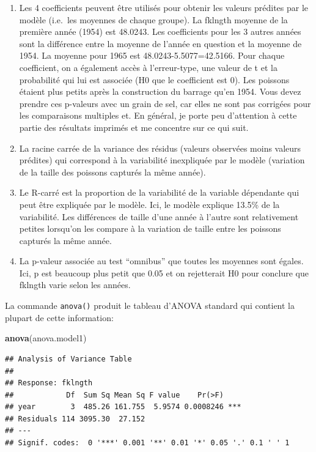 \documentclass[12pt,]{book}
\newenvironment{Shaded}{\begin{snugshade}}{\end{snugshade}}
\newcommand{\KeywordTok}[1]{\textcolor[rgb]{0.27,0.27,0.27}{\textbf{#1}}}
\newcommand{\NormalTok}[1]{#1}
\providecommand{\tightlist}{%
  \setlength{\itemsep}{0pt}\setlength{\parskip}{0pt}}
\begin{document}
\begin{enumerate}
\def\labelenumi{\arabic{enumi}.}
\tightlist
\item
  Les 4 coefficients peuvent être utilisés pour obtenir les valeurs prédites par le modèle (i.e.~les moyennes de chaque groupe). La fklngth moyenne de la première année (1954) est 48.0243. Les coefficients pour les 3 autres années sont la différence entre la moyenne de l'année en question et la moyenne de 1954. La moyenne pour 1965 est 48.0243-5.5077=42.5166. Pour chaque coefficient, on a également accès à l'erreur-type, une valeur de t et la probabilité qui lui est associée (H0 que le coefficient est 0). Les poissons étaient plus petits après la construction du barrage qu'en 1954. Vous devez prendre ces p-valeurs avec un grain de sel, car elles ne sont pas corrigées pour les comparaisons multiples et. En général, je porte peu d'attention à cette partie des résultats imprimés et me concentre sur ce qui suit.
\item
  La racine carrée de la variance des résidus (valeurs observées moins valeurs prédites) qui correspond à la variabilité inexpliquée par le modèle (variation de la taille des poissons capturés la même année).
\item
  Le R-carré est la proportion de la variabilité de la variable dépendante qui peut être expliquée par le modèle. Ici, le modèle explique 13.5\% de la variabilité. Les différences de taille d'une année à l'autre sont relativement petites lorsqu'on les compare à la variation de taille entre les poissons capturés la même année.
\item
  La p-valeur associée au test ``omnibus'' que toutes les moyennes sont égales. Ici, p est beaucoup plus petit que 0.05 et on rejetterait H0 pour conclure que fklngth varie selon les années.
\end{enumerate}

La commande \texttt{anova()} produit le tableau d'ANOVA standard qui contient la plupart de cette information:

\begin{Shaded}
\begin{Highlighting}[]
\KeywordTok{anova}\NormalTok{(anova.model1)}
\end{Highlighting}
\end{Shaded}

\begin{verbatim}
## Analysis of Variance Table
## 
## Response: fklngth
##            Df  Sum Sq Mean Sq F value    Pr(>F)    
## year        3  485.26 161.755  5.9574 0.0008246 ***
## Residuals 114 3095.30  27.152                      
## ---
## Signif. codes:  0 '***' 0.001 '**' 0.01 '*' 0.05 '.' 0.1 ' ' 1
\end{verbatim}
\end{document}
